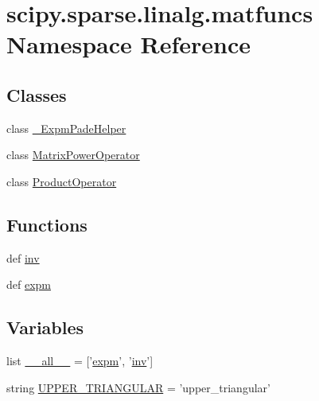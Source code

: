 \hypertarget{namespacescipy_1_1sparse_1_1linalg_1_1matfuncs}{}\section{scipy.\+sparse.\+linalg.\+matfuncs Namespace Reference}
\label{namespacescipy_1_1sparse_1_1linalg_1_1matfuncs}
\subsection*{Classes}
\begin{DoxyCompactItemize}
\item 
class \hyperlink{classscipy_1_1sparse_1_1linalg_1_1matfuncs_1_1__ExpmPadeHelper}{\+\_\+\+Expm\+Pade\+Helper}
\item 
class \hyperlink{classscipy_1_1sparse_1_1linalg_1_1matfuncs_1_1MatrixPowerOperator}{Matrix\+Power\+Operator}
\item 
class \hyperlink{classscipy_1_1sparse_1_1linalg_1_1matfuncs_1_1ProductOperator}{Product\+Operator}
\end{DoxyCompactItemize}
\subsection*{Functions}
\begin{DoxyCompactItemize}
\item 
def \hyperlink{namespacescipy_1_1sparse_1_1linalg_1_1matfuncs_a552f836210c209101b7363f0ddb6c027}{inv}
\item 
def \hyperlink{namespacescipy_1_1sparse_1_1linalg_1_1matfuncs_ad64374dc8eda23f15ce0d4397e4d31a0}{expm}
\end{DoxyCompactItemize}
\subsection*{Variables}
\begin{DoxyCompactItemize}
\item 
list \hyperlink{namespacescipy_1_1sparse_1_1linalg_1_1matfuncs_add152720710230158e8541f4cee5e321}{\+\_\+\+\_\+all\+\_\+\+\_\+} = \mbox{[}'\hyperlink{namespacescipy_1_1sparse_1_1linalg_1_1matfuncs_ad64374dc8eda23f15ce0d4397e4d31a0}{expm}', '\hyperlink{namespacescipy_1_1sparse_1_1linalg_1_1matfuncs_a552f836210c209101b7363f0ddb6c027}{inv}'\mbox{]}
\item 
string \hyperlink{namespacescipy_1_1sparse_1_1linalg_1_1matfuncs_a146f13e82ea133f0acd513a8b6e66fb3}{U\+P\+P\+E\+R\+\_\+\+T\+R\+I\+A\+N\+G\+U\+L\+A\+R} = 'upper\+\_\+triangular'
\end{DoxyCompactItemize}


